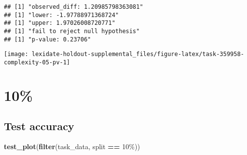 \documentclass[
]{book}
\newenvironment{Shaded}{\begin{snugshade}}{\end{snugshade}}
\newcommand{\AttributeTok}[1]{\textcolor[rgb]{0.13,0.29,0.53}{#1}}
\newcommand{\DecValTok}[1]{\textcolor[rgb]{0.00,0.00,0.81}{#1}}
\newcommand{\FunctionTok}[1]{\textcolor[rgb]{0.13,0.29,0.53}{\textbf{#1}}}
\newcommand{\NormalTok}[1]{#1}
\newcommand{\OtherTok}[1]{\textcolor[rgb]{0.56,0.35,0.01}{#1}}
\newcommand{\SpecialCharTok}[1]{\textcolor[rgb]{0.81,0.36,0.00}{\textbf{#1}}}
\newcommand{\StringTok}[1]{\textcolor[rgb]{0.31,0.60,0.02}{#1}}
\begin{document}
\begin{Shaded}
\end{Shaded}

\begin{verbatim}
## [1] "observed_diff: 1.20985798363081"
## [1] "lower: -1.97788971368724"
## [1] "upper: 1.97026008720771"
## [1] "fail to reject null hypothesis"
## [1] "p-value: 0.23706"
\end{verbatim}

\texttt{[image: lexidate-holdout-supplemental\_files/figure-latex/task-359958-complexity-05-pv-1]}

\hypertarget{section-31}{%
\section{10\%}\label{section-31}}

\hypertarget{test-accuracy-31}{%
\subsection{Test accuracy}\label{test-accuracy-31}}

\begin{Shaded}
\begin{Highlighting}[]
\FunctionTok{test\_plot}\NormalTok{(}\FunctionTok{filter}\NormalTok{(task\_data, split }\SpecialCharTok{==} \StringTok{\textquotesingle{}10\%\textquotesingle{}}\NormalTok{))}
\end{Highlighting}
\end{Shaded}
\end{document}
